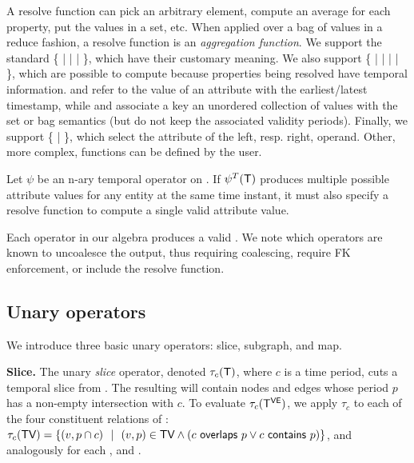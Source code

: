 A resolve function can pick an arbitrary element, compute an average
for each property, put the values in a set, etc.  When applied over a
bag of values in a reduce fashion, a resolve function is an {\em
  aggregation function}.  We support the standard \{  |
 |  |  \}, which have their customary
meaning.  We also support \{  |  |
 |  |  \}, which are possible to
compute because properties being resolved have temporal information.
 and  refer to the value of an attribute with
the earliest/latest timestamp, while  and 
associate a key an unordered collection of values with the set or bag
semantics (but do not keep the associated validity periods).  Finally,
we support \{  |  \}, which select the
attribute of the left, resp. right, operand.  Other, more complex,
functions can be defined by the user.

\begin{lemma}
Let $\psi$ be an n-ary temporal operator on \tg.  If $\psi^T (\mathsf{T})$
produces multiple possible attribute values for any entity at the same
time instant, it must also specify a resolve function to compute a
single valid attribute value.
\end{lemma}


Each operator in our algebra produces a valid \tg.  We note which
operators are known to uncoalesce the output, thus requiring
coalescing, require FK enforcement, or include the resolve function.

\subsection{Unary operators}
\label{sec:algebra:unary}

We introduce three basic unary operators: slice, subgraph, and map.

{\bf Slice.}  The unary {\em slice} operator, denoted $\tau_c (\mathsf{T})$,
where $c$ is a time period, cuts a temporal slice from \ttt.  The
resulting \tg will contain nodes and edges whose period $p$ has a
non-empty intersection with $c$.  To evaluate $\tau_c (\mathsf{T^{VE}})$, we
apply $\tau_c$ to each of the four constituent relations of \tve:
$\tau_c (\textsf{TV}) = \{ (v, p \cap c)~~|~~(v, p) \in \textsf{TV} \wedge
(c~\mathsf{overlaps}~p \vee c~\mathsf{contains}~p) \}$, and
analogously for each \te, \tav and \tae.

